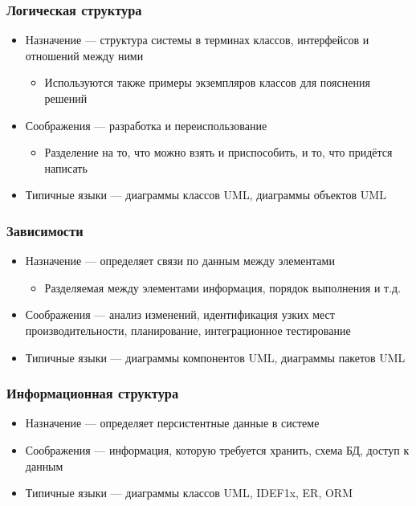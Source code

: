 \documentclass[xetex,mathserif,serif]{beamer}
\begin{document}
	\begin{frame}
		\frametitle{Логическая структура}
		\begin{itemize}
			\item Назначение --- структура системы в терминах классов, интерфейсов и отношений между ними
			\begin{itemize}
				\item Используются также примеры экземпляров классов для пояснения решений
			\end{itemize}
			\item Соображения --- разработка и переиспользование
			\begin{itemize}
				\item Разделение на то, что можно взять и приспособить, и то, что придётся написать
			\end{itemize}
			\item Типичные языки --- диаграммы классов UML, диаграммы объектов UML
		\end{itemize}
	\end{frame}

	\begin{frame}
		\frametitle{Зависимости}
		\begin{itemize}
			\item Назначение --- определяет связи по данным между элементами
			\begin{itemize}
				\item Разделяемая между элементами информация, порядок выполнения и т.д.
			\end{itemize}
			\item Соображения --- анализ изменений, идентификация узких мест производительности, планирование, интеграционное тестирование
			\item Типичные языки --- диаграммы компонентов UML, диаграммы пакетов UML
		\end{itemize}
	\end{frame}

	\begin{frame}
		\frametitle{Информационная структура}
		\begin{itemize}
			\item Назначение --- определяет персистентные данные в системе
			\item Соображения --- информация, которую требуется хранить, схема БД, доступ к данным
			\item Типичные языки --- диаграммы классов UML, IDEF1x, ER, ORM
		\end{itemize}
	\end{frame}
\end{document}
